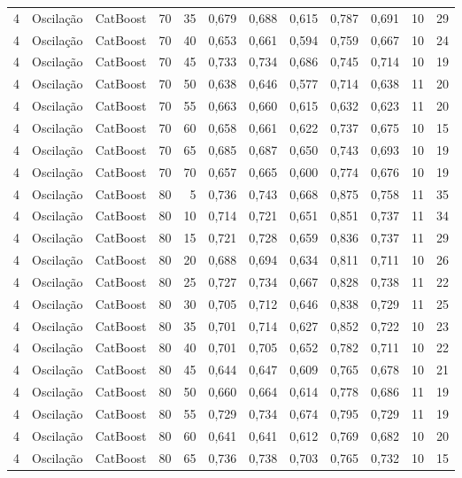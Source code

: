 \begin{longtable}{@{}rllrrrrrrrrr@{}}
4 & Oscilação & CatBoost & 70 & 35 & 0,679 & 0,688 & 0,615 & 0,787 & 0,691 & 10 & 29 \\
4 & Oscilação & CatBoost & 70 & 40 & 0,653 & 0,661 & 0,594 & 0,759 & 0,667 & 10 & 24 \\
4 & Oscilação & CatBoost & 70 & 45 & 0,733 & 0,734 & 0,686 & 0,745 & 0,714 & 10 & 19 \\
4 & Oscilação & CatBoost & 70 & 50 & 0,638 & 0,646 & 0,577 & 0,714 & 0,638 & 11 & 20 \\
4 & Oscilação & CatBoost & 70 & 55 & 0,663 & 0,660 & 0,615 & 0,632 & 0,623 & 11 & 20 \\
4 & Oscilação & CatBoost & 70 & 60 & 0,658 & 0,661 & 0,622 & 0,737 & 0,675 & 10 & 15 \\
4 & Oscilação & CatBoost & 70 & 65 & 0,685 & 0,687 & 0,650 & 0,743 & 0,693 & 10 & 19 \\
4 & Oscilação & CatBoost & 70 & 70 & 0,657 & 0,665 & 0,600 & 0,774 & 0,676 & 10 & 19 \\
4 & Oscilação & CatBoost & 80 & 5 & 0,736 & 0,743 & 0,668 & 0,875 & 0,758 & 11 & 35 \\
4 & Oscilação & CatBoost & 80 & 10 & 0,714 & 0,721 & 0,651 & 0,851 & 0,737 & 11 & 34 \\
4 & Oscilação & CatBoost & 80 & 15 & 0,721 & 0,728 & 0,659 & 0,836 & 0,737 & 11 & 29 \\
4 & Oscilação & CatBoost & 80 & 20 & 0,688 & 0,694 & 0,634 & 0,811 & 0,711 & 10 & 26 \\
4 & Oscilação & CatBoost & 80 & 25 & 0,727 & 0,734 & 0,667 & 0,828 & 0,738 & 11 & 22 \\
4 & Oscilação & CatBoost & 80 & 30 & 0,705 & 0,712 & 0,646 & 0,838 & 0,729 & 11 & 25 \\
4 & Oscilação & CatBoost & 80 & 35 & 0,701 & 0,714 & 0,627 & 0,852 & 0,722 & 10 & 23 \\
4 & Oscilação & CatBoost & 80 & 40 & 0,701 & 0,705 & 0,652 & 0,782 & 0,711 & 10 & 22 \\
4 & Oscilação & CatBoost & 80 & 45 & 0,644 & 0,647 & 0,609 & 0,765 & 0,678 & 10 & 21 \\
4 & Oscilação & CatBoost & 80 & 50 & 0,660 & 0,664 & 0,614 & 0,778 & 0,686 & 11 & 19 \\
4 & Oscilação & CatBoost & 80 & 55 & 0,729 & 0,734 & 0,674 & 0,795 & 0,729 & 11 & 19 \\
4 & Oscilação & CatBoost & 80 & 60 & 0,641 & 0,641 & 0,612 & 0,769 & 0,682 & 10 & 20 \\
4 & Oscilação & CatBoost & 80 & 65 & 0,736 & 0,738 & 0,703 & 0,765 & 0,732 & 10 & 15 \\

\end{longtable}
